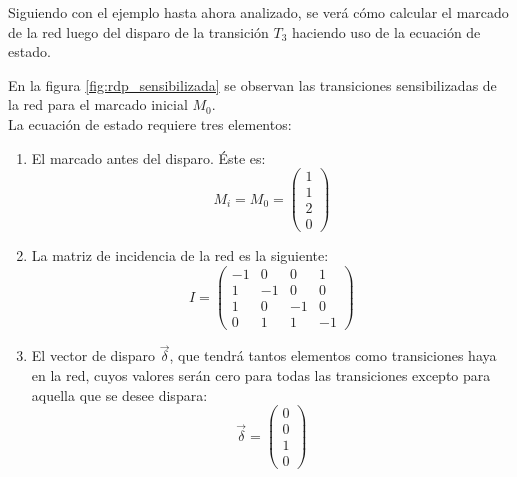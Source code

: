 Siguiendo con el ejemplo hasta ahora analizado, se verá cómo calcular el marcado de la red luego del disparo de la transición $T_3$ haciendo uso de la ecuación de estado.

En la figura \ref{fig:rdp_sensibilizada} se observan las transiciones sensibilizadas de la red para el marcado inicial $M_0$.
\\
La ecuación de estado requiere tres elementos:
\begin{enumerate}
    \item El marcado antes del disparo. Éste es:
        \begin{equation}
            M_i = M_0 = 
            \begin{pmatrix}
                1 \\
                1 \\
                2 \\
                0
            \end{pmatrix}
        \end{equation}
        
    \item La matriz de incidencia de la red es la siguiente:
        \begin{equation}
           I = 
            \begin{pmatrix}
                -1 & 0 & 0 & 1 \\
                1 & -1 & 0 & 0 \\
                1 & 0 & -1 & 0 \\
                0 & 1 & 1 & -1 
            \end{pmatrix}
        \end{equation}
        
    \item El vector de disparo $\vec{\delta}$, que tendrá tantos elementos como transiciones haya en la red, cuyos valores serán cero para todas las transiciones excepto para aquella que se desee dispara:
        \begin{equation}
            \vec{\delta} = 
            \begin{pmatrix}
                0 \\
                0 \\
                1 \\
                0
            \end{pmatrix}
        \end{equation}
\end{enumerate}

